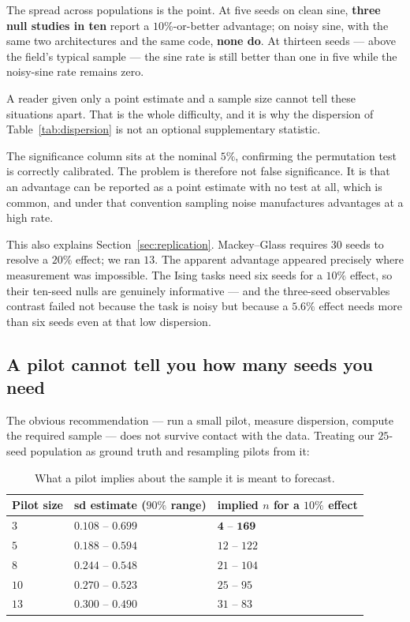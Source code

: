 \documentclass[11pt,onecolumn]{article}
\begin{document}
The spread across populations is the point. At five seeds on clean sine,
\textbf{three null studies in ten} report a $10\%$-or-better advantage;
on noisy sine, with the same two architectures and the same code,
\textbf{none do}. At thirteen seeds --- above the field's typical sample
--- the sine rate is still better than one in five while the noisy-sine
rate remains zero.

A reader given only a point estimate and a sample size cannot tell these
situations apart. That is the whole difficulty, and it is why the
dispersion of Table~\ref{tab:dispersion} is not an optional
supplementary statistic.

The significance column sits at the nominal $5\%$, confirming the
permutation test is correctly calibrated. The problem is therefore not
false significance. It is that an advantage can be reported as a point
estimate with no test at all, which is common, and under that convention
sampling noise manufactures advantages at a high rate.

This also explains Section~\ref{sec:replication}. Mackey--Glass requires
$30$ seeds to resolve a $20\%$ effect; we ran $13$. The apparent
advantage appeared precisely where measurement was impossible. The Ising
tasks need six seeds for a $10\%$ effect, so their ten-seed nulls are
genuinely informative --- and the three-seed observables contrast failed
not because the task is noisy but because a $5.6\%$ effect needs more
than six seeds even at that low dispersion.

\subsection{A pilot cannot tell you how many seeds you need}
\label{sec:pilot}
The obvious recommendation --- run a small pilot, measure dispersion,
compute the required sample --- does not survive contact with the data.
Treating our $25$-seed population as ground truth and resampling pilots
from it:

\begin{table}[htb]\centering\small
\caption{What a pilot implies about the sample it is meant to forecast.}
\begin{tabular}{lll}
\toprule
Pilot size & sd estimate ($90\%$ range) & implied $n$ for a $10\%$ effect \\
\midrule
$3$  & $0.108$ -- $0.699$ & $\mathbf{4}$ -- $\mathbf{169}$ \\
$5$  & $0.188$ -- $0.594$ & $12$ -- $122$ \\
$8$  & $0.244$ -- $0.548$ & $21$ -- $104$ \\
$10$ & $0.270$ -- $0.523$ & $25$ -- $95$ \\
$13$ & $0.300$ -- $0.490$ & $31$ -- $83$ \\
\bottomrule
\end{tabular}
\end{table}
\end{document}
